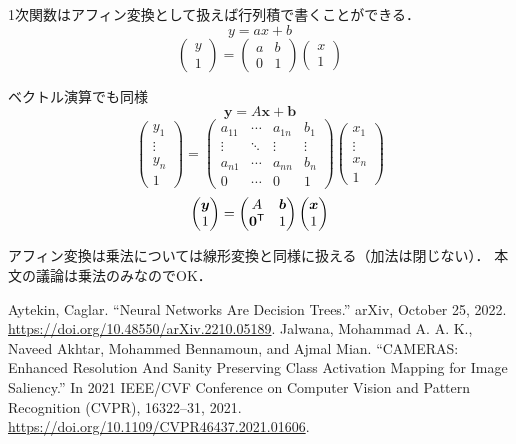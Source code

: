 \documentclass[dvipdfmx,autodetect-engine,12pt,fleqn]{jsarticle}
\begin{document}
1次関数はアフィン変換として扱えば行列積で書くことができる．
\[
y=ax+b
\]
\[
\begin{pmatrix}y \\ 1\end{pmatrix}
= \begin{pmatrix}a & b \\ 0 & 1\end{pmatrix}\begin{pmatrix}x \\ 1\end{pmatrix}
\]

ベクトル演算でも同様
\[
\bm{y} = A\bm{x}+\bm{b}
\]
\[
\begin{pmatrix}y_1 \\ \vdots \\ y_n \\ 1\end{pmatrix}
= \begin{pmatrix}a_{11} & \cdots & a_{1n} & b_1 \\
\vdots & \ddots & \vdots & \vdots\\
a_{n1} & \cdots & a_{nn} & b_n\\
0 & \cdots & 0 & 1\end{pmatrix}\begin{pmatrix}x_1 \\ \vdots \\ x_n \\ 1\end{pmatrix}
\]
\[
\begin{pmatrix}
\bm{y} \\ 1
\end{pmatrix}
=
\begin{pmatrix}
A & \bm{b} \\ \bm{0}^{\mathsf{T}} & 1
\end{pmatrix}
\begin{pmatrix}
\bm{x} \\ 1
\end{pmatrix}
\]

アフィン変換は乗法については線形変換と同様に扱える（加法は閉じない）．
本文の議論は乗法のみなのでOK．

\begin{thebibliography}{9}
 Aytekin, Caglar. “Neural Networks Are Decision Trees.” arXiv, October 25, 2022. \url{https://doi.org/10.48550/arXiv.2210.05189}.
 Jalwana, Mohammad A. A. K., Naveed Akhtar, Mohammed Bennamoun, and Ajmal Mian. “CAMERAS: Enhanced Resolution And Sanity Preserving Class Activation Mapping for Image Saliency.” In 2021 IEEE/CVF Conference on Computer Vision and Pattern Recognition (CVPR), 16322–31, 2021. \url{https://doi.org/10.1109/CVPR46437.2021.01606}.
\end{thebibliography}
\end{document}
